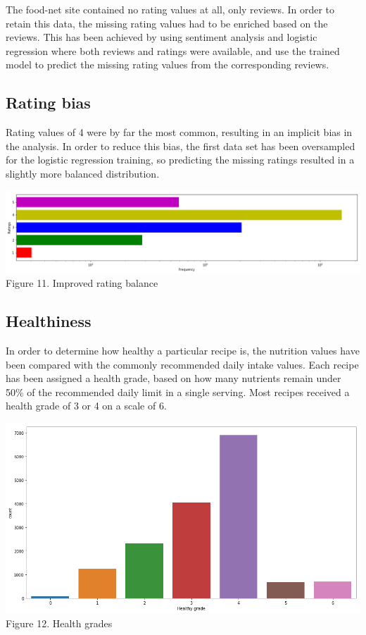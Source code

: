 \documentclass[11pt]{article}
\begin{document}
The food-net site contained no rating values at all, only reviews. In order to retain this data, the missing rating values had to be enriched based on the reviews. This has been achieved by using sentiment analysis and logistic regression where both reviews and ratings were available, and use the trained model to predict the missing rating values from the corresponding reviews.

\subsection{Rating bias}

Rating values of 4 were by far the most common, resulting in an implicit bias in the analysis. In order to reduce this bias, the first data set has been oversampled for the logistic regression training, so predicting the missing ratings resulted in a slightly more balanced distribution.

\vspace{5mm}
\begin{center}
\includegraphics[scale=0.18]{rating-balanced}
\label{rating-balanced} Figure 11. Improved rating balance
\end{center}
\vspace{5mm}

\subsection{Healthiness}

In order to determine how healthy a particular recipe is, the nutrition values have been compared with the commonly recommended daily intake values. Each recipe has been assigned a health grade, based on how many nutrients remain under 50\% of the recommended daily limit in a single serving. Most recipes received a health grade of 3 or 4 on a scale of 6.

\vspace{5mm}
\begin{center}
\includegraphics[scale=0.22]{health-grade}
\label{health-grade} Figure 12. Health grades
\end{center}
\vspace{5mm}
\end{document}

